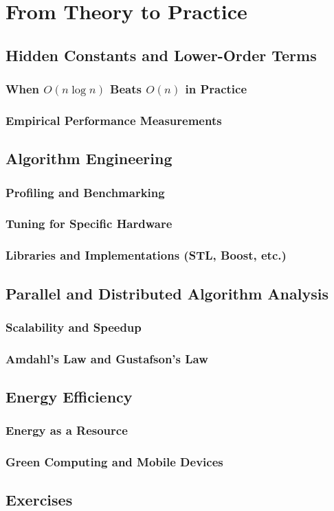 
\chapter{From Theory to Practice}
\section{Hidden Constants and Lower-Order Terms}
\subsection{When $O(n \log n)$ Beats $O(n)$ in Practice}
\subsection{Empirical Performance Measurements}

\section{Algorithm Engineering}
\subsection{Profiling and Benchmarking}
\subsection{Tuning for Specific Hardware}
\subsection{Libraries and Implementations (STL, Boost, etc.)}

\section{Parallel and Distributed Algorithm Analysis}
\subsection{Scalability and Speedup}
\subsection{Amdahl's Law and Gustafson's Law}

\section{Energy Efficiency}
\subsection{Energy as a Resource}
\subsection{Green Computing and Mobile Devices}

\section{Exercises}
